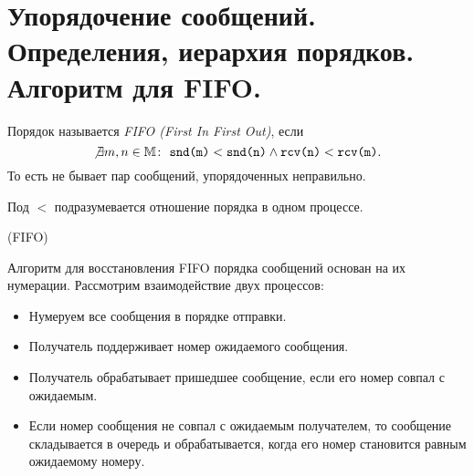 \section{Упорядочение сообщений. Определения, иерархия порядков. Алгоритм для FIFO.}

\begin{definition}
    Порядок называется \textit{FIFO (First In First Out)}, если
    \[
        \not \exists m,n \in \mathbb{M} \colon~ \texttt{snd(m)} < \texttt{snd(n)}
        \wedge \texttt{rcv(n)} < \texttt{rcv(m)}
    .\]
    То есть не бывает пар сообщений, упорядоченных неправильно.
\end{definition}

\begin{remark}
    Под $<$ подразумевается отношение порядка в одном процессе.
\end{remark}

\begin{algorithm}(FIFO)

    Алгоритм для восстановления FIFO порядка сообщений основан на их нумерации. Рассмотрим взаимодействие двух процессов:
    \begin{itemize}
        \item Нумеруем все сообщения в порядке отправки.
        \item Получатель поддерживает номер ожидаемого сообщения.
        \item Получатель обрабатывает пришедшее сообщение, если его номер совпал с ожидаемым.
        \item Если номер сообщения не совпал с ожидаемым получателем, то сообщение складывается в очередь и обрабатывается, когда его номер становится равным ожидаемому номеру.
    \end{itemize}
\end{algorithm}
